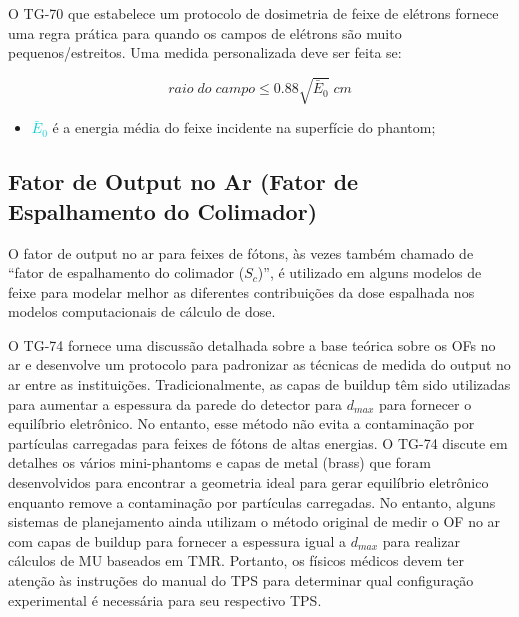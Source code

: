 \documentclass[11pt,a4paper]{article}
\newcounter{exemplo}
\begin{document}
	O TG-70 que estabelece um protocolo de dosimetria de feixe de elétrons fornece uma regra prática para quando os campos de elétrons são muito pequenos/estreitos. Uma medida personalizada deve ser feita se:

		\begin{equation}
			raio \; do \; campo \leq 0.88 \sqrt{\bar{E}_0} \; cm
		\end{equation}

	\begin{exemplo}[onde:]
		\begin{itemize}[label=\textcolor{CarnationPink}{$\star$}]
			\item \textcolor{DarkTurquoise}{$\bar{E}_0$} é a energia média do feixe incidente na superfície do phantom;
		\end{itemize}
	\end{exemplo}

	\begin{figure}[h]
		\centering
	\end{figure}

\subsection{Fator de Output no Ar (Fator de Espalhamento do Colimador)}

	O fator de output no ar para feixes de fótons, às vezes também chamado de “fator de espalhamento do colimador ($S_c$)”, é utilizado em alguns modelos de feixe para modelar melhor as diferentes contribuições da dose espalhada nos modelos computacionais de cálculo de dose. 

	O TG-74 fornece uma discussão detalhada sobre a base teórica sobre os OFs no ar e desenvolve um protocolo para padronizar as técnicas de medida do output no ar entre as instituições. Tradicionalmente, as capas de buildup têm sido utilizadas para aumentar a espessura da parede do detector para $d_{max}$ para fornecer o equilíbrio eletrônico. No entanto, esse método não evita a contaminação por partículas carregadas para feixes de fótons de altas energias. O TG-74 discute em detalhes os vários mini-phantoms e capas de metal (brass) que foram desenvolvidos para encontrar a geometria ideal para gerar equilíbrio eletrônico enquanto remove a contaminação por partículas carregadas. No entanto, alguns sistemas de planejamento ainda utilizam o método original de medir o OF no ar com capas de buildup para fornecer a espessura igual a $d_{max}$ para realizar cálculos de MU baseados em TMR. Portanto, os físicos médicos devem ter atenção às instruções do manual do TPS para determinar qual configuração experimental é necessária para seu respectivo TPS.
\end{document}
